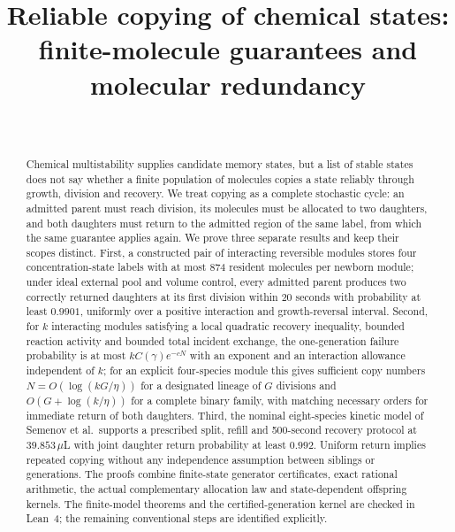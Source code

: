 \documentclass[11pt,a4paper]{article}
\title{Reliable copying of chemical states:\\ finite-molecule guarantees and molecular redundancy}
\author{\PaperAuthor\\[2pt] {\small\itshape \PaperAffiliation}}
\date{\PaperDate}
\theoremstyle{plain}
\theoremstyle{definition}
\theoremstyle{remark}
\newcommand{\micro}{\mu}
\begin{document}
\maketitle

\begin{abstract}
Chemical multistability supplies candidate memory states, but a list of stable states does not say whether a finite population of molecules copies a state reliably through growth, division and recovery. We treat copying as a complete stochastic cycle: an admitted parent must reach division, its molecules must be allocated to two daughters, and both daughters must return to the admitted region of the same label, from which the same guarantee applies again. We prove three separate results and keep their scopes distinct. First, a constructed pair of interacting reversible modules stores four concentration-state labels with at most 874 resident molecules per newborn module; under ideal external pool and volume control, every admitted parent produces two correctly returned daughters at its first division within 20 seconds with probability at least $0.9901$, uniformly over a positive interaction and growth-reversal interval. Second, for $k$ interacting modules satisfying a local quadratic recovery inequality, bounded reaction activity and bounded total incident exchange, the one-generation failure probability is at most $kC(\gamma)e^{-cN}$ with an exponent and an interaction allowance independent of $k$; for an explicit four-species module this gives sufficient copy numbers $N=O(\log(kG/\eta))$ for a designated lineage of $G$ divisions and $O(G+\log(k/\eta))$ for a complete binary family, with matching necessary orders for immediate return of both daughters. Third, the nominal eight-species kinetic model of Semenov et al.\ supports a prescribed split, refill and 500-second recovery protocol at $39.853\,\micro$L with joint daughter return probability at least $0.992$. Uniform return implies repeated copying without any independence assumption between siblings or generations. The proofs combine finite-state generator certificates, exact rational arithmetic, the actual complementary allocation law and state-dependent offspring kernels. The finite-model theorems and the certified-generation kernel are checked in Lean~4; the remaining conventional steps are identified explicitly.
\end{abstract}








\appendix






\end{document}
